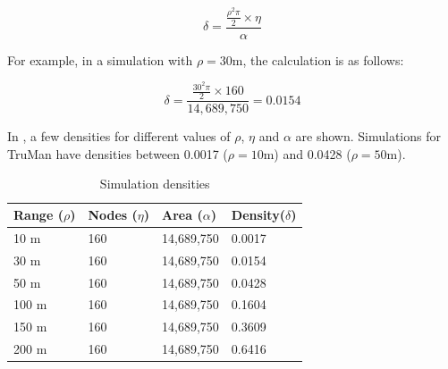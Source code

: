 $$ \delta = \frac{\frac{\rho^2\pi}{2} \times \eta}{\alpha} $$

For example, in a simulation with $\rho = 30$m, the calculation is as follows:

$$ \delta = \frac{\frac{30^2\pi}{2} \times 160}{14,689,750} = 0.0154$$

In , a few densities for different values of $\rho$, $\eta$ and $\alpha$ are shown. 
Simulations for TruMan have densities between 0.0017 ($\rho = 10$m) and 0.0428 ($\rho = 50$m).

\begin{table}[h!]
\caption{Simulation densities}
\label{table:simdensities}
\centering
\begin{tabular}{|p{2cm}|p{2cm}|p{2cm}|p{2cm}|}
 \hline
 \textbf{Range ($\rho$)} & \textbf{Nodes ($\eta$)} & \textbf{Area ($\alpha$)} & \textbf{Density($\delta$)} \\
 \hline
 \hline
 10 m & 160 & 14,689,750 & 0.0017 \\
 \hline
 30 m & 160 & 14,689,750 & 0.0154 \\
 \hline
 50 m & 160 & 14,689,750 & 0.0428 \\
 \hline
 100 m & 160 & 14,689,750 & 0.1604 \\
 \hline
 150 m & 160 & 14,689,750 & 0.3609 \\
 \hline
 200 m & 160 & 14,689,750 & 0.6416 \\
 \hline
\end{tabular}
\end{table}


